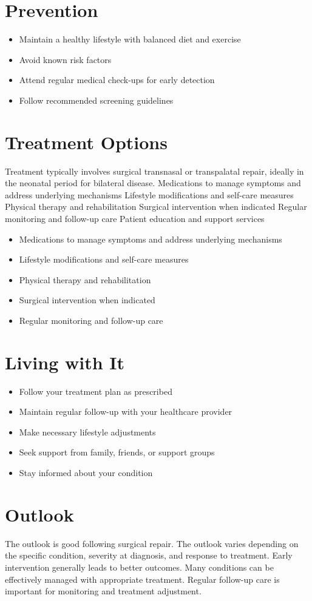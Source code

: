 \section{Prevention}
\begin{itemize}[noitemsep]
  \item Maintain a healthy lifestyle with balanced diet and exercise
  \item Avoid known risk factors
  \item Attend regular medical check-ups for early detection
  \item Follow recommended screening guidelines
\end{itemize}
\section{Treatment Options}
Treatment typically involves surgical transnasal or transpalatal repair, ideally in the neonatal period for bilateral disease. Medications to manage symptoms and address underlying mechanisms Lifestyle modifications and self-care measures Physical therapy and rehabilitation Surgical intervention when indicated Regular monitoring and follow-up care Patient education and support services

\begin{itemize}[noitemsep]
  \item Medications to manage symptoms and address underlying mechanisms
  \item Lifestyle modifications and self-care measures
  \item Physical therapy and rehabilitation
  \item Surgical intervention when indicated
  \item Regular monitoring and follow-up care
\end{itemize}
\section{Living with It}
\begin{itemize}[noitemsep]
  \item Follow your treatment plan as prescribed
  \item Maintain regular follow-up with your healthcare provider
  \item Make necessary lifestyle adjustments
  \item Seek support from family, friends, or support groups
  \item Stay informed about your condition
\end{itemize}
\section{Outlook}
The outlook is good following surgical repair. The outlook varies depending on the specific condition, severity at diagnosis, and response to treatment. Early intervention generally leads to better outcomes. Many conditions can be effectively managed with appropriate treatment. Regular follow-up care is important for monitoring and treatment adjustment.

